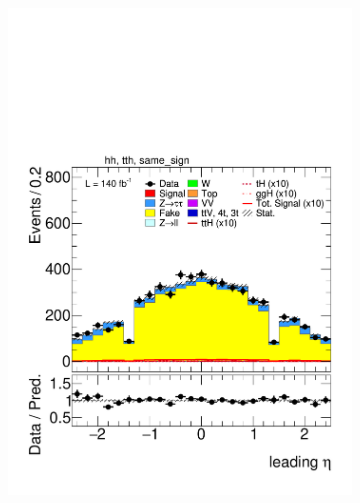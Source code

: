 \begin{figure}[htbp]
\begin{subfigure}[b]{0.45\textwidth}
      \includegraphics[width=\textwidth]{images/same_sign_same_sign_run2/plot_tau_0_eta_hh_tth_15_16_17_18_same_sign.pdf}
      \caption{}
    \end{subfigure}


\end{figure}
